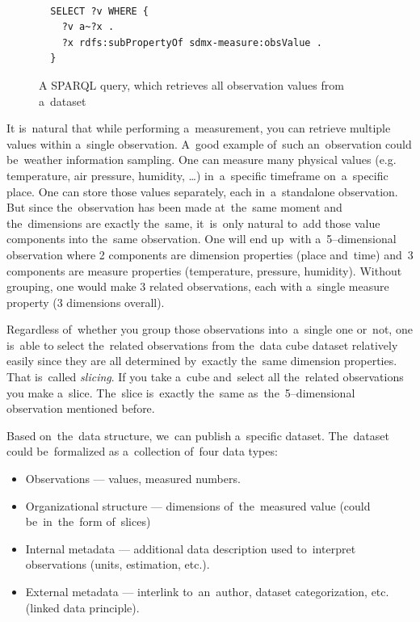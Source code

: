 \begin{figure}
\begin{verbatim}
  
  SELECT ?v WHERE {
    ?v a~?x .
    ?x rdfs:subPropertyOf sdmx-measure:obsValue .
  }

\end{verbatim}
\caption{A SPARQL query, which retrieves all observation values from a~dataset}
\label{fig:sparql-obsValue}
\end{figure}

It is~natural that while performing a~measurement, you can retrieve multiple
values within a~single observation. A~good example of~such an~observation could be~weather
information sampling. One can measure many physical values (e.g. temperature, air pressure,
humidity, …) in~a~specific timeframe on~a~specific place. One can store those values separately,
each in~a~standalone observation. But since the~observation has been made at~the~same moment
and the~dimensions are exactly the~same, it~is~only natural to~add those value components into
the~same observation. One will end up~with a~5--dimensional observation where 2 components 
are dimension properties (place and~time) and~3 components are measure properties
(temperature, pressure, humidity). Without grouping, one would make 3 related observations,
each with a~single measure property (3 dimensions overall).

Regardless of~whether you group those observations into~a~single one or~not, one is~able
to select the~related observations from the~data cube dataset relatively easily since they
are all determined by~exactly the~same dimension properties. That is~called \emph{slicing}.
If you take a~cube and~select all the~related observations you make a~slice. The~slice is~exactly
the~same as~the~5--dimensional observation mentioned before.

Based on~the~data structure, we~can publish a~specific dataset. The~dataset could be~formalized
as a~collection of~four data types:
\begin{sloppypar}
\begin{itemize}
\item Observations --- values, measured numbers.
\item Organizational structure --- dimensions of~the~measured value (could be~in~the~form of~slices)
\item Internal metadata --- additional data description used to~interpret observations (units, estimation,
etc.).
\item External metadata --- interlink to~an~author, dataset categorization, etc. (linked data 
principle).
\end{itemize}
\end{sloppypar}

